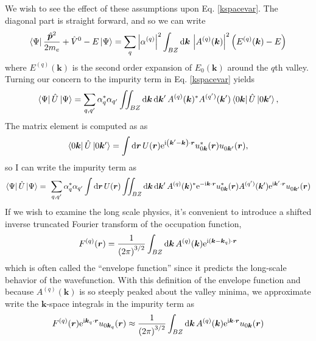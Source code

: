 We wish to see the effect of these assumptions upon
Eq. \eqref{kspacevar}. The diagonal part is straight forward, and so
we can write
\begin{equation}
  \textstyle \left\langle \Psi \right| \displaystyle\frac{\hat{\bm{p}}^2}{2 m_e} + \hat{V}^0 - E\textstyle \left| \Psi \right\rangle \displaystyle
  =
  \sum_{q}
  \left|\alpha^{(q)}\right|^2
  \int_{BZ}
  \mathrm{d}\bm{k}\,
  \left|A^{(q)}(\bm{k})\right|^2\left(E^{(q)}(\bm{k})-E\right)
  \label{kin0}
\end{equation}
where $E^{(q)}(\bm{k})$ is the second order expansion of $E_0(\bm{k})$
around the $q$th valley. Turning our concern to the impurity term in
Eq. \eqref{kspacevar} yields
\begin{equation}
  \textstyle \left\langle \Psi \right| \displaystyle\hat{U}\textstyle \left| \Psi \right\rangle \displaystyle 
  =
  \sum_{q,q^\prime}
  \alpha_{q}^*\alpha_{q^\prime}
  \iint_{BZ}\mathrm{d}\bm{k}\,\mathrm{d}\bm{k}^\prime\,
  A^{(q)}(\bm{k})^{*}A^{(q^\prime)}(\bm{k}^\prime)
  \textstyle \left\langle 0\bm{k} \right| \displaystyle\hat{U}\textstyle \left| 0\bm{k}^\prime \right\rangle \displaystyle,
\end{equation}
The matrix element is computed as as
\begin{equation}
  \textstyle \left\langle 0\bm{k} \right| \displaystyle\hat{U}\textstyle \left| 0\bm{k}^\prime \right\rangle \displaystyle
  =
  \int \mathrm{d}\bm{r}\,
  U(\bm{r})
  \mathrm{e}^{\mathrm{i}\left(\bm{k}^\prime - \bm{k}\right)\cdot\bm{r}}
  u_{0\bm{k}}^*(\bm{r})u_{0\bm{k}^\prime}^{}(\bm{r}), 
\end{equation}
so I can write the impurity term as
\begin{equation}
  \textstyle \left\langle \Psi \right| \displaystyle\hat{U}\textstyle \left| \Psi \right\rangle \displaystyle 
  = \
  \sum_{q,q^\prime}
  \alpha_{q}^*\alpha_{q^\prime}
  \int \mathrm{d}\bm{r}\, U(\bm{r})
  \iint_{BZ}\mathrm{d}\bm{k}\,\mathrm{d}\bm{k}^\prime\,
  A^{(q)}(\bm{k})^{*}\mathrm{e}^{-\mathrm{i}\bm{k}\cdot\bm{r}}u_{0\bm{k}}^*(\bm{r})
  A^{(q^\prime)}(\bm{k}^\prime)\mathrm{e}^{\mathrm{i}\bm{k}^{\prime}\cdot\bm{r}}
  u_{0\bm{k}^\prime}^{}(\bm{r})
\end{equation}
If we wish to examine the long scale physics, it's convenient to
introduce a shifted inverse truncated Fourier transform of the
occupation function,
\begin{equation}
  F^{(q)}(\bm{r}) = 
  \frac{1}{\left(2\pi\right)^{3/2}}
  \int_{BZ}\mathrm{d}\bm{k}\,
  A^{(q)}(\bm{k})
  \mathrm{e}^{\mathrm{i}\left(\bm{k}-\bm{k}_{q}\right)\cdot\bm{r}}
\end{equation}
which is often called the ``envelope function'' since it predicts the
long-scale behavior of the wavefunction. With this definition of the
envelope function and because $A^{(q)}(\bm{k})$ is so steeply peaked about
the valley minima, we approximate write the $\bm{k}$-space integrals
in the impurity term as
\begin{equation}
  F^{(q)}(\bm{r})
  \mathrm{e}^{\mathrm{i}\bm{k}_{q}\cdot\bm{r}}
  u_{0\bm{k}_{q}}(\bm{r})
  \approx 
  \frac{1}{\left(2\pi\right)^{3/2}}
  \int_{BZ}\mathrm{d}\bm{k}\,
  A^{(q)}(\bm{k})
  \mathrm{e}^{\mathrm{i}\bm{k}\cdot\bm{r}}
  u_{0\bm{k}}(\bm{r})
\end{equation}
